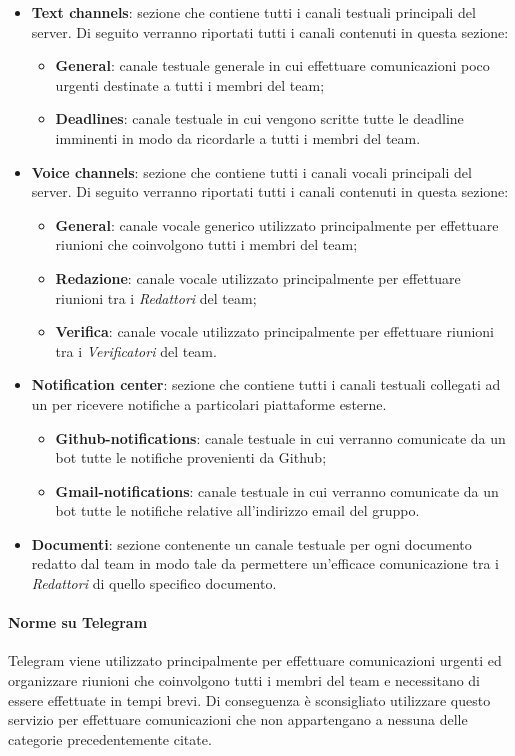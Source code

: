  \begin{itemize}
	\item{\textbf{Text channels}: sezione che contiene tutti i canali testuali principali del server. Di seguito verranno riportati tutti i canali contenuti in questa sezione:
		\begin{itemize}
			\item{\textbf{General}: canale testuale generale in cui effettuare comunicazioni poco urgenti destinate a tutti i membri del team;}
			\item{\textbf{Deadlines}: canale testuale in cui vengono scritte tutte le deadline imminenti in modo da ricordarle a tutti i membri del team.}
		\end{itemize}
	}
	\item{\textbf{Voice channels}: sezione che contiene tutti i canali vocali principali del server. Di seguito verranno riportati tutti i canali contenuti in questa sezione:
		\begin{itemize}
			\item{\textbf{General}: canale vocale generico utilizzato principalmente per effettuare riunioni che coinvolgono tutti i membri del team;}
			\item{\textbf{Redazione}: canale vocale utilizzato principalmente per effettuare riunioni tra i \emph{Redattori} del team;}
			\item{\textbf{Verifica}: canale vocale utilizzato principalmente per effettuare riunioni tra i \emph{Verificatori} del team.}
		\end{itemize}
	}
	\item{\textbf{Notification center}: sezione che contiene tutti i canali testuali collegati ad un  per ricevere notifiche a particolari piattaforme esterne.
		\begin{itemize}
			\item{\textbf{Github-notifications}: canale testuale in cui verranno comunicate da un bot tutte le notifiche provenienti da Github;}
			\item{\textbf{Gmail-notifications}: canale testuale in cui verranno comunicate da un bot tutte le notifiche relative all'indirizzo email del gruppo.}			
		\end{itemize}
	}
	\item{\textbf{Documenti}: sezione contenente un canale testuale per ogni documento redatto dal team in modo tale da permettere un'efficace comunicazione tra i \emph{Redattori} di quello specifico documento.}
 \end{itemize}
\paragraph{Norme su Telegram}\Spazio
 Telegram viene utilizzato principalmente per effettuare comunicazioni urgenti ed organizzare riunioni che coinvolgono tutti i membri del team e necessitano di essere effettuate in tempi brevi. Di conseguenza è sconsigliato utilizzare questo servizio per effettuare comunicazioni che non appartengano a nessuna delle categorie precedentemente citate.

